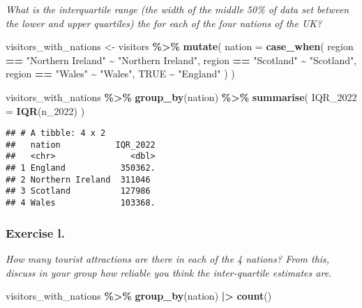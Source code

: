 \documentclass[
]{article}
\newenvironment{Shaded}{\begin{snugshade}}{\end{snugshade}}
\newcommand{\AttributeTok}[1]{\textcolor[rgb]{0.13,0.29,0.53}{#1}}
\newcommand{\ConstantTok}[1]{\textcolor[rgb]{0.56,0.35,0.01}{#1}}
\newcommand{\FunctionTok}[1]{\textcolor[rgb]{0.13,0.29,0.53}{\textbf{#1}}}
\newcommand{\NormalTok}[1]{#1}
\newcommand{\OtherTok}[1]{\textcolor[rgb]{0.56,0.35,0.01}{#1}}
\newcommand{\SpecialCharTok}[1]{\textcolor[rgb]{0.81,0.36,0.00}{\textbf{#1}}}
\newcommand{\StringTok}[1]{\textcolor[rgb]{0.31,0.60,0.02}{#1}}
\begin{document}
\emph{What is the interquartile range (the width of the middle 50\% of
data set between the lower and upper quartiles) the for each of the four
nations of the UK?}

\begin{Shaded}
\begin{Highlighting}[]
\NormalTok{visitors\_with\_nations }\OtherTok{\textless{}{-}}\NormalTok{ visitors }\SpecialCharTok{\%\textgreater{}\%}
  \FunctionTok{mutate}\NormalTok{(}
    \AttributeTok{nation =} \FunctionTok{case\_when}\NormalTok{(}
\NormalTok{      region }\SpecialCharTok{==} \StringTok{"Northern Ireland"} \SpecialCharTok{\textasciitilde{}} \StringTok{"Northern Ireland"}\NormalTok{,}
\NormalTok{      region }\SpecialCharTok{==} \StringTok{"Scotland"} \SpecialCharTok{\textasciitilde{}} \StringTok{"Scotland"}\NormalTok{,}
\NormalTok{      region }\SpecialCharTok{==} \StringTok{"Wales"} \SpecialCharTok{\textasciitilde{}} \StringTok{"Wales"}\NormalTok{,}
      \ConstantTok{TRUE} \SpecialCharTok{\textasciitilde{}} \StringTok{"England"}
\NormalTok{    )}
\NormalTok{  )}

\NormalTok{visitors\_with\_nations }\SpecialCharTok{\%\textgreater{}\%} 
  \FunctionTok{group\_by}\NormalTok{(nation) }\SpecialCharTok{\%\textgreater{}\%}
  \FunctionTok{summarise}\NormalTok{(}
    \AttributeTok{IQR\_2022 =} \FunctionTok{IQR}\NormalTok{(n\_2022)}
\NormalTok{  )}
\end{Highlighting}
\end{Shaded}

\begin{verbatim}
## # A tibble: 4 x 2
##   nation           IQR_2022
##   <chr>               <dbl>
## 1 England           350362.
## 2 Northern Ireland  311046 
## 3 Scotland          127986 
## 4 Wales             103368.
\end{verbatim}

\subsubsection{Exercise l.}\label{exercise-l.}

\emph{How many tourist attractions are there in each of the 4 nations?
From this, discuss in your group how reliable you think the
inter-quartile estimates are.}

\begin{Shaded}
\begin{Highlighting}[]
\NormalTok{visitors\_with\_nations }\SpecialCharTok{\%\textgreater{}\%}
  \FunctionTok{group\_by}\NormalTok{(nation) }\SpecialCharTok{|\textgreater{}} 
  \FunctionTok{count}\NormalTok{()}
\end{Highlighting}
\end{Shaded}
\end{document}
